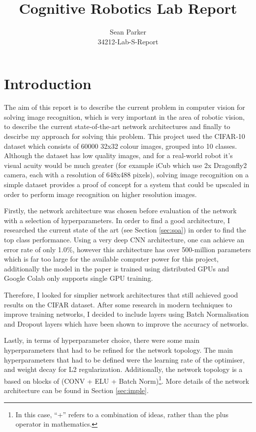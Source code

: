 \documentclass[12pt]{article}
\title{Cognitive Robotics Lab Report}
\author{Sean Parker\\
34212-Lab-S-Report}
\begin{document}
\maketitle

\section{Introduction}
The aim of this report is to describe the current problem in computer vision for solving image recognition, which is very important in the area of robotic vision, to describe the current state-of-the-art network architectures and finally to descirbe my approach for solving this problem. This project used the CIFAR-10 dataset which consists of 60000 32x32 colour images, grouped into 10 classes. Although the dataset has low quality images, and for a real-world robot it's visual acuity would be much greater (for example iCub which use 2x Dragonfly2 camera, each with a resolution of 648x488 pixels), solving image recognition on a simple dataset provides a proof of concept for a system that could be upscaled in order to perform image recognition on higher resolution images.

Firstly, the network architecture was chosen before evaluation of the network with a selection of hyperparameters. In order to find a good architecture, I researched the current state of the art (see Section \ref{sec:soa}) in order to find the top class performance. Using a very deep CNN architecture, one can achieve an error rate of only 1.0\%\cite{huang2018gpipe}, however this architecture has over 500-million parameters which is far too large for the available computer power for this project, additionally the model in the paper is trained using distributed GPUs and Google Colab only supports single GPU training.

Therefore, I looked for simplier network architectures that still achieved good results on the CIFAR dataset. After some research in modern techniques to improve training networks, I decided to include layers using Batch Normalisation and Dropout layers which have been shown to improve the accuracy of networks\cite{dropout, batch-norm}.

Lastly, in terms of hyperparameter choice, there were some main hyperparameters that had to be refined for the network topology. The main hyperparameters that had to be defined were the learning rate of the optimiser, and weight decay for L2 regularization. Additionally, the network topology is a based on blocks of (CONV + ELU + Batch Norm)\footnote{In this case, ``+'' refers to a combination of ideas, rather than the plus operator in mathematics.}. More details of the network architecture can be found in Section \ref{sec:imple}.
\end{document}
